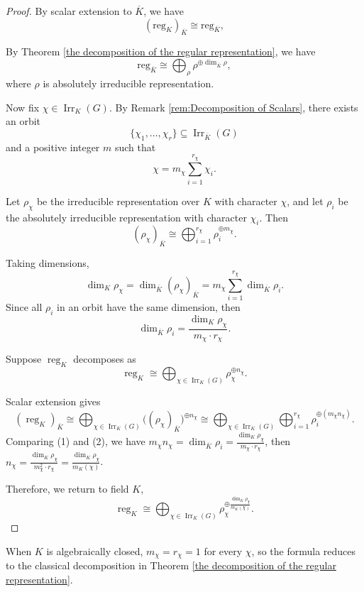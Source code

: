 \begin{proof}
By scalar extension to \(\overline K\), we have
\[
(\mathrm{reg}_K)_{\overline K} \cong \mathrm{reg}_{\overline K},
\]

By Theorem \ref{the decomposition of the regular representation}, we have
\[
\mathrm{reg}_{\overline K} \cong \bigoplus_{\rho } \rho^{\oplus \dim_{\overline{K}} \rho},\tag{1}
\]where $\rho $ is absolutely irreducible representation.

Now fix \(\chi \in \operatorname{Irr}_K(G)\). By Remark \ref{rem:Decomposition of Scalars}, there exists an orbit
\[
 \{\chi_1, \dots, \chi_{r}\} \subseteq \operatorname{Irr}_{\overline K}(G)
\]
and a positive integer \(m\) such that
\[
\chi = m_\chi \sum_{i=1}^{r_\chi} \chi_i.
\]

Let \(\rho_\chi\) be the irreducible representation over $K$ with character \(\chi\), and let \(\rho_i\) be the absolutely irreducible representation with character \(\chi_i\). Then
\[
(\rho_\chi)_{\overline K} \cong \bigoplus_{i=1}^{r_\chi} \rho_i^{\oplus m_\chi}. 
\]

Taking dimensions,
\[
\dim_K \rho_\chi =\dim_{\overline{K}}(\rho_\chi)_{\overline{K}}= m_\chi \sum_{i=1}^{r_\chi} \dim _{\overline{K}}\rho_i.
\]
Since all \(\rho_i\) in an orbit have the same dimension, then
\[
\dim _{\overline{K}}\rho_i = \frac{\dim_K \rho_\chi}{m_\chi\cdot r_\chi}. 
\]

Suppose \(\operatorname{reg}_K\) decomposes as
\[
\operatorname{reg}_K \cong \bigoplus_{\chi \in \operatorname{Irr}_K(G)} \rho_\chi^{\oplus n_\chi}.
\]

Scalar extension gives
\[
(\operatorname{reg}_K)_{\overline K}
\cong \bigoplus_{\chi \in \operatorname{Irr}_K(G)} \big((\rho_\chi)_{\overline K}\big)^{\oplus n_\chi}
\cong \bigoplus_{\chi \in \operatorname{Irr}_K(G)}
\bigoplus_{i=1}^{r_\chi} \rho_i^{\oplus (m_\chi n_\chi)}.\tag{2}
\]
Comparing (1) and (2), we have  $m_\chi n_\chi = \dim _{\overline{K}}\rho_i = \frac{\dim_K \rho_\chi}{m_\chi\cdot r_\chi}$, then $n_\chi=\frac{\dim_K \rho_\chi}{m_\chi^2 \cdot r_\chi}=\frac{\dim_K \rho_\chi}{m_K(\chi)}$.

Therefore, we return to field $K$,
\[
\operatorname{reg}_K \cong \bigoplus_{\chi \in \operatorname{Irr}_K(G)}
\rho_\chi^{\oplus \frac{\dim_K \rho_\chi}{m_K(\chi)}}.
\]

\end{proof}

\begin{remark}
When \(K\) is algebraically closed, \(m_\chi = r_\chi = 1\) for every \(\chi\), so the formula reduces to the classical decomposition in Theorem \ref{the decomposition of the regular representation}.
\end{remark}

